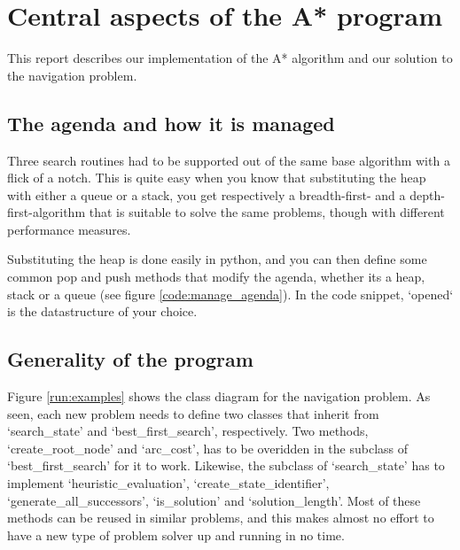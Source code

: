\section{Central aspects of the A* program}
This report describes our implementation of the A* algorithm and our solution to the navigation problem.

\subsection{The agenda and how it is managed}

Three search routines had to be supported out of the same base algorithm with a flick of a notch. This is quite easy when you know that substituting the heap with either a queue or a stack, you get respectively a breadth-first- and a depth-first-algorithm that is suitable to solve the same problems, though with different performance measures.

Substituting the heap is done easily in python, and you can then define some common pop and push methods that modify the agenda, whether its a heap, stack or a queue (see figure \ref{code:manage_agenda}). In the code snippet, `opened` is the datastructure of your choice.



\subsection{Generality of the program}



Figure \ref{run:examples} shows the class diagram for the navigation problem. As seen, each new problem needs to define two classes that inherit from `search\_state' and `best\_first\_search', respectively. Two methods, `create\_root\_node' and `arc\_cost', has to be overidden in the subclass of `best\_first\_search' for it to work. Likewise, the subclass of `search\_state' has to implement `heuristic\_evaluation', `create\_state\_identifier', `generate\_all\_successors', `is\_solution' and `solution\_length'. Most of these methods can be reused in similar problems, and this makes almost no effort to have a new type of problem solver up and running in no time.

